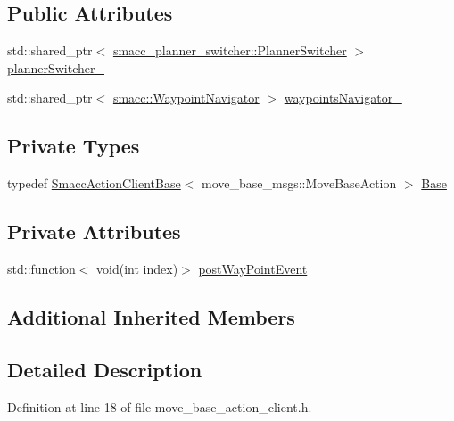 \subsection*{Public Attributes}
\begin{DoxyCompactItemize}
\item 
std\+::shared\+\_\+ptr$<$ \hyperlink{classsmacc__planner__switcher_1_1PlannerSwitcher}{smacc\+\_\+planner\+\_\+switcher\+::\+Planner\+Switcher} $>$ \hyperlink{classsmacc_1_1ClMoveBaseZ_a1a20609e1b4a9406cd6cece0d74acfe5}{planner\+Switcher\+\_\+}
\item 
std\+::shared\+\_\+ptr$<$ \hyperlink{classsmacc_1_1WaypointNavigator}{smacc\+::\+Waypoint\+Navigator} $>$ \hyperlink{classsmacc_1_1ClMoveBaseZ_a9df38a2b5fb0e0ed23a00d66fb9b9c20}{waypoints\+Navigator\+\_\+}
\end{DoxyCompactItemize}
\subsection*{Private Types}
\begin{DoxyCompactItemize}
\item 
typedef \hyperlink{classsmacc_1_1SmaccActionClientBase}{Smacc\+Action\+Client\+Base}$<$ move\+\_\+base\+\_\+msgs\+::\+Move\+Base\+Action $>$ \hyperlink{classsmacc_1_1ClMoveBaseZ_a87baee189885db32480cb8f90f425528}{Base}
\end{DoxyCompactItemize}
\subsection*{Private Attributes}
\begin{DoxyCompactItemize}
\item 
std\+::function$<$ void(int index)$>$ \hyperlink{classsmacc_1_1ClMoveBaseZ_a085a93e68532a6c66e9499d9a1318668}{post\+Way\+Point\+Event}
\end{DoxyCompactItemize}
\subsection*{Additional Inherited Members}


\subsection{Detailed Description}


Definition at line 18 of file move\+\_\+base\+\_\+action\+\_\+client.\+h.



